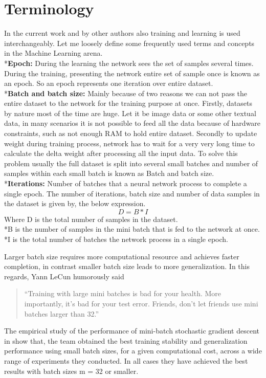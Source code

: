 \section{Terminology}
In the current work and by other authors also training and learning is used interchangeably. Let me loosely define some frequently used terms and concepts in the Machine Learning arena.
\\*\textbf{Epoch:}
During the learning the network sees the set of samples several times. During the training, presenting the network entire set of sample once is known as an epoch. So an epoch represents one iteration over entire dataset.
\\*\textbf{Batch and batch size:}
Mainly because of two reasons we can not pass the entire dataset to the network for the training purpose at once. Firstly, datasets by nature most of the time are huge. Let it be image data or some other textual data, in many scenarios it is not possible to feed all the data because of hardware constraints, such as not enough RAM to hold entire dataset.
Secondly to update weight during training process, network has to wait for a very very long time to calculate the delta weight after processing all the input data. To solve this problem usually the full dataset is split into several small batches and number of samples within each small batch is known as 
Batch and batch size.
\\*\textbf{Iterations:} 
Number of batches that a neural network process to complete a single epoch.
The number of  iterations, batch size and  number of data samples in the dataset is given by, the below expression.
\begin{equation}
    D = B * I
\end{equation}
Where D is the total number of samples in the dataset.
\\*B is the number of samples in the mini batch that is fed to the network at once.
\\*I is the  total number of batches the network process in a single epoch.

Larger batch size requires more computational resource and achieves faster completion, in contrast smaller batch size leads to more generalization. In this regards, Yann  LeCun humorously said
\begin{quote}
``Training with large mini batches is bad for your health. More importantly, it's bad for your test error.  Friends, don't let friends use mini batches larger than 32.''
\end{quote}   
The empirical study of the performance of mini-batch stochastic gradient descent in \cite{masters2018revisiting} show that, the team obtained the best training stability and generalization performance using small batch sizes, for a given computational cost, across a wide range of experiments they conducted. In all cases they have achieved the best results with batch sizes m = 32 or smaller.


